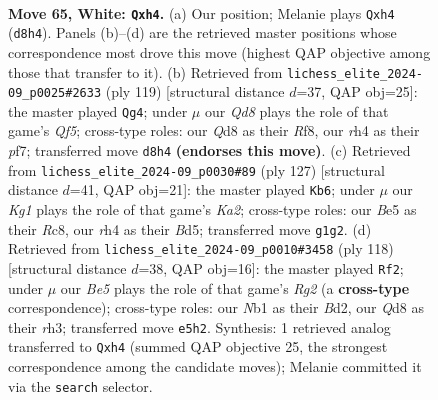\documentclass[11pt]{article}
\begin{document}
\clearpage

\begin{figure}[p]\centering
\begin{subfigure}{0.46\textwidth}\centering
\resizebox{\linewidth}{!}{%
\newchessgame
\chessboard[
  setfen={3Q4/1k6/8/p2pBp2/P6r/8/8/RN4K1 w - - 10 65},
  showmover=false,
  pgfstyle=straightmove, color=movearrow, markmove={d8-h4}
]}
\caption{}
\end{subfigure}\hfill
\begin{subfigure}{0.46\textwidth}\centering
\resizebox{\linewidth}{!}{%
\newchessgame
\chessboard[
  setfen={5r1k/5Pp1/2p5/7p/5q1P/8/5P2/7K b - - 11 60},
  showmover=false,
  pgfstyle=straightmove, color=movearrow, markmove={f4-g4}
]}
\caption{}
\end{subfigure}
\\[4pt]
\begin{subfigure}{0.46\textwidth}\centering
\resizebox{\linewidth}{!}{%
\newchessgame
\chessboard[
  setfen={2r5/k7/2n5/p2b3R/8/1P1K1P2/P7/8 b - - 3 64},
  showmover=false,
  pgfstyle=straightmove, color=movearrow, markmove={a7-b6}
]}
\caption{}
\end{subfigure}\hfill
\begin{subfigure}{0.46\textwidth}\centering
\resizebox{\linewidth}{!}{%
\newchessgame
\chessboard[
  setfen={8/5kp1/8/3n1p2/5P1P/7r/3BK1R1/8 w - - 21 60},
  showmover=false,
  pgfstyle=straightmove, color=movearrow, markmove={g2-f2}
]}
\caption{}
\end{subfigure}
\caption{\textbf{Move 65, White: \texttt{Qxh4}.} (a) Our position; Melanie plays \texttt{Qxh4} (\texttt{d8h4}). Panels (b)--(d) are the retrieved master positions whose correspondence most drove this move (highest QAP objective among those that transfer to it). (b) Retrieved from \texttt{lichess\_elite\_2024-09\_p0025\#2633} (ply 119) [structural distance $d$=37, QAP obj=25]: the master played \texttt{Qg4}; under $\mu$ our \emph{Qd8} plays the role of that game's \emph{Qf5}; cross-type roles: our \emph{Q}d8 as their \emph{R}f8, our \emph{r}h4 as their \emph{p}f7; transferred move \texttt{d8h4} \textbf{(endorses this move)}. (c) Retrieved from \texttt{lichess\_elite\_2024-09\_p0030\#89} (ply 127) [structural distance $d$=41, QAP obj=21]: the master played \texttt{Kb6}; under $\mu$ our \emph{Kg1} plays the role of that game's \emph{Ka2}; cross-type roles: our \emph{B}e5 as their \emph{R}c8, our \emph{r}h4 as their \emph{B}d5; transferred move \texttt{g1g2}. (d) Retrieved from \texttt{lichess\_elite\_2024-09\_p0010\#3458} (ply 118) [structural distance $d$=38, QAP obj=16]: the master played \texttt{Rf2}; under $\mu$ our \emph{Be5} plays the role of that game's \emph{Rg2} (a \textbf{cross-type} correspondence); cross-type roles: our \emph{N}b1 as their \emph{B}d2, our \emph{Q}d8 as their \emph{r}h3; transferred move \texttt{e5h2}. Synthesis: 1 retrieved analog transferred to \texttt{Qxh4} (summed QAP objective 25, the strongest correspondence among the candidate moves); Melanie committed it via the \texttt{search} selector.}
\label{fig:thought-m128}
\end{figure}
\end{document}
